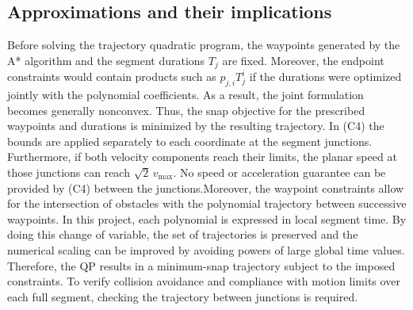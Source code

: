 \subsection{Approximations and their implications}
Before solving the trajectory quadratic program, the waypoints generated by the A* algorithm and the segment durations \(T_j\) are fixed. Moreover, the endpoint constraints would contain products such as \(p_{j,i}T_j^i\) if the durations were optimized jointly with the polynomial coefficients. As a result, the joint formulation becomes generally nonconvex. Thus, the snap objective for the prescribed waypoints and durations is minimized by the resulting trajectory.
In (C4) the bounds are applied separately to each coordinate at the segment junctions. Furthermore, if both velocity components reach their limits, the planar speed at those junctions can reach \(\sqrt{2}\,v_{\max}\). No speed or acceleration guarantee can be provided by (C4) between the junctions.Moreover, the waypoint constraints allow for the intersection of obstacles with the polynomial trajectory between successive waypoints.
In this project, each polynomial is expressed in local segment time. By doing this change of variable, the set of trajectories is preserved and the numerical scaling can be improved by avoiding powers of large global time values.
Therefore, the QP results in a minimum-snap trajectory subject to the imposed constraints. To verify collision avoidance and compliance with motion limits over each full segment, checking the trajectory between junctions is required.
